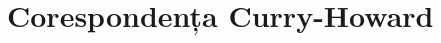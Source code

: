 \documentclass[xcolor=pdftex,romanian,colorlinks]{beamer}
\begin{document}
%
%
%
%
%
%
%
%

\section{\color{section-color}Corespondența Curry-Howard}
\end{document}
